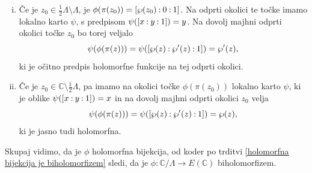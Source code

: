 \documentclass[mat1]{fmfdelo}
\numberwithin{equation}{section}
\newcommand{\C}{\mathbb C}
\newcommand{\HH}{\mathfrak{H}}
\newcommand{\torus}{\C/\Lambda}
\newcommand{\pcoor}[1]{%
\begingroup\lccode`~=`: \lowercase{\endgroup
\edef~}{\mathbin{\mathchar\the\mathcode`:}\nobreak}%
\left[%
\begingroup
\mathcode`:=\string"8000
#1%
\endgroup
\right]%
}
\newcommand{\ti}{t.~i.\ }
\theoremstyle{definition}
\begin{document}
\begin{dokaz}
\begin{enumerate}[(i)]
        \item
        Če je $z_0 \in \tfrac{1}{2}\Lambda\setminus\Lambda$, je $\phi(\pi(z_0)) = \pcoor{\wp(z_0) : 0 : 1}$. Na odprti okolici te točke imamo lokalno karto $\psi$, s predpisom $\psi(\pcoor{x : y : 1}) = y$. Na dovolj majhni odprti okolici točke $z_0$ bo torej veljalo
        \[
            \psi(\phi(\pi(z))) = \psi(\pcoor{\wp(z) : \wp'(z) : 1}) = \wp'(z),  
        \]
        ki je očitno predpis holomorfne funkcije na tej odprti okolici.

        \item
        Če je $z_0 \in \C\setminus\tfrac{1}{2}\Lambda$, pa imamo na okolici točke $\phi(\pi(z_0))$ lokalno karto $\psi$, ki je oblike $\psi(\pcoor{x : y : 1}) = x$ in na dovolj majhni odprti okolici $z_0$ velja
        \[
            \psi(\phi(\pi(z))) = \psi(\pcoor{\wp(z) : \wp'(z) : 1}) = \wp(z),  
        \]
        ki je jasno tudi holomorfna. 
    \end{enumerate}

    Skupaj vidimo, da je $\phi$ holomorfna bijekcija, od koder po trditvi \ref{holomorfna bijekcija je biholomorfizem} sledi, da je $\phi: \torus \to E(\C)$ biholomorfizem.
\end{dokaz}

 


\end{document}
